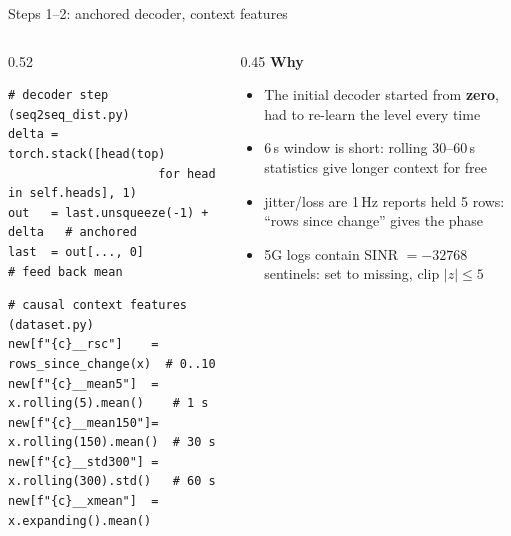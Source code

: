 \documentclass[aspectratio=169,11pt]{beamer}
\begin{document}
\begin{frame}[fragile]{Steps 1--2: anchored decoder, context features}
  \begin{columns}[T,onlytextwidth]
  \begin{column}{0.52\textwidth}
\begin{lstlisting}
# decoder step (seq2seq_dist.py)
delta = torch.stack([head(top)
                     for head in self.heads], 1)
out   = last.unsqueeze(-1) + delta   # anchored
last  = out[..., 0]                  # feed back mean
\end{lstlisting}
  \vspace{0.1cm}
\begin{lstlisting}
# causal context features (dataset.py)
new[f"{c}__rsc"]    = rows_since_change(x)  # 0..10
new[f"{c}__mean5"]  = x.rolling(5).mean()    # 1 s
new[f"{c}__mean150"]= x.rolling(150).mean()  # 30 s
new[f"{c}__std300"] = x.rolling(300).std()   # 60 s
new[f"{c}__xmean"]  = x.expanding().mean()
\end{lstlisting}
  \end{column}
  \begin{column}{0.45\textwidth}
  \textbf{Why}
  \begin{itemize}\small
    \item The initial decoder started from \textbf{zero}, had to re-learn the level every time
    \item 6\,s window is short: rolling 30--60\,s statistics give longer context for free
    \item jitter/loss are 1\,Hz reports held 5 rows: ``rows since change'' gives the phase
    \item 5G logs contain SINR $=-32768$ sentinels: set to missing, clip $|z|\le5$
  \end{itemize}
  \end{column}
  \end{columns}
\end{frame}
\end{document}
